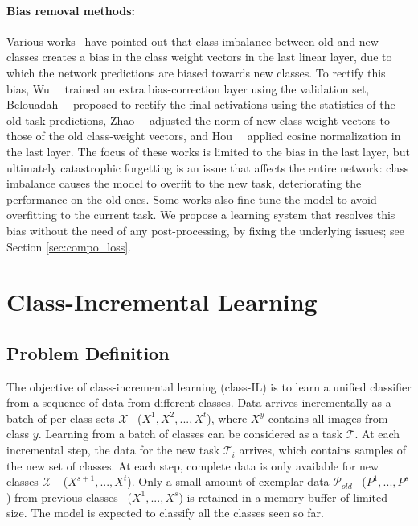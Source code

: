 \documentclass[final]{cvpr}
\begin{document}
\paragraph{Bias removal methods:}
Various works~\cite{lucir, bic, fairness} have pointed out that class-imbalance between old and new classes creates a bias in the class weight vectors in the last linear layer, due to which the network predictions are biased towards new classes.
To rectify this bias, Wu~\etal~\cite{bic} trained an extra bias-correction layer using the validation set, Belouadah~\etal~\cite{Belouadah_2019_ICCV} proposed to rectify the final activations using the statistics of the old task predictions, Zhao~\etal~\cite{fairness} adjusted the norm of new class-weight vectors to those of the old class-weight vectors, and 
Hou~\etal~\cite{lucir} applied cosine normalization in the last layer.
The focus of these works is limited to the bias in the last layer, but ultimately catastrophic forgetting is an issue that affects the entire network: class imbalance causes the model to overfit to the new task, deteriorating the performance on the old ones. 
Some works \cite{eeil, unlabeled} also fine-tune the model to avoid overfitting to the current task. We propose a learning system that resolves this bias without the need of any post-processing, by fixing the underlying issues; see Section \ref{sec:compo_loss}. 

 
 \section{Class-Incremental Learning}


\subsection{Problem Definition}
The objective of class-incremental learning (class-IL) is to learn a unified classifier from a sequence of data from different classes. Data arrives incrementally as a batch of per-class sets $\mathcal{X}$ \ie~($X^1, X^2,...,X^t$), where $X^y$ contains all images from class $y$. Learning from a batch of classes can be considered as a task $\mathcal{T}$. 
At each incremental step, the data for the new task $\mathcal{T}_i$ arrives, which contains samples of the new set of classes. 
At each step, complete data is only available for new classes $\mathcal{X}$~\ie~($X^{s+1},...,X^t$). Only a small amount of exemplar data $\mathcal{P}_{old}$ \ie~($P^1,...,P^s$) from previous classes \ie~($X^1,...,X^s$) is retained in a memory buffer of limited size. The model is expected to classify all the classes seen so far. 
\end{document}
